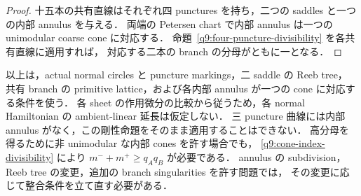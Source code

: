 \begin{proof}
十五本の共有直線はそれぞれ四 punctures を持ち，二つの saddles と一つの内部 annulus を与える．
両端の Petersen chart で内部 annulus は一つの unimodular coarse cone に対応する．
命題~\ref{q9:four-puncture-divisibility} を各共有直線に適用すれば，
対応する二本の branch の分母がともに一となる．
\end{proof}

\begin{remark}[適用範囲と高分母に必要な変更]\label{q9:scope}
以上は，actual normal circles と puncture markings，二 saddle の Reeb tree，
共有 branch の primitive lattice，および各内部 annulus が一つの cone に対応する条件を使う．
各 sheet の作用微分の比較から従うため，各 normal Hamiltonian の ambient-linear 延長は仮定しない．
三 puncture 曲線には内部 annulus がなく，この剛性命題をそのまま適用することはできない．
高分母を得るために非 unimodular な内部 cones を許す場合でも，
\eqref{q9:cone-index-divisibility} により $m^-+m^+\geq q_Aq_B$ が必要である．
annulus の subdivision，Reeb tree の変更，追加の branch singularities を許す問題では，
その変更に応じて整合条件を立て直す必要がある．
\end{remark}
